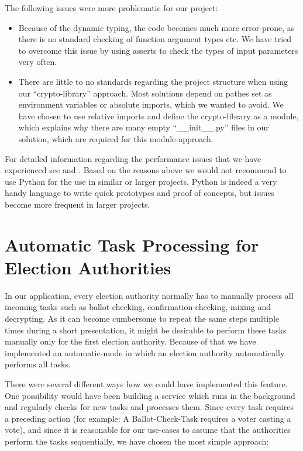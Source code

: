 The following issues were more problematic for our project:
\begin{itemize}
	\item Because of the dynamic typing, the code becomes much more error-prone, as there is no standard checking of function argument types etc. We have tried to overcome this issue by using asserts to check the types of input parameters very often.
	\item There are little to no standards regarding the project structure when using our "`crypto-library"' approach. Most solutions depend on pathes set as environment variables or absolute imports, which we wanted to avoid. We have chosen to use relative imports and define the crypto-library as a module, which explains why there are many empty "`\_\_init\_\_.py"' files in our solution, which are required for this module-approach.
\end{itemize}

For detailed information regarding the performance issues that we have experienced see \cite{slowpy} and \cite{slowpy2}. Based on the reasons above we would not recommend to use Python for the use in similar or larger projects. Python is indeed a very handy language to write quick prototypes and proof of concepts, but issues become more frequent in larger projects.

\section{Automatic Task Processing for Election Authorities}
In our application, every election authority normally has to manually process all incoming tasks such as ballot checking, confirmation checking, mixing and decrypting. As it can become cumbersome to repeat the same steps multiple times during a short presentation, it might be desirable to perform these tasks manually only for the first election authority. Because of that we have implemented an automatic-mode in which an election authority automatically performs all tasks.

There were several different ways how we could have implemented this feature. One possibility would have been building a service which runs in the background and regularly checks for new tasks and processes them. Since every task requires a preceding action (for example: A Ballot-Check-Task requires a voter casting a vote), and since it is reasonable for our use-cases to assume that the authorities perform the tasks sequentially, we have chosen the most simple approach:

